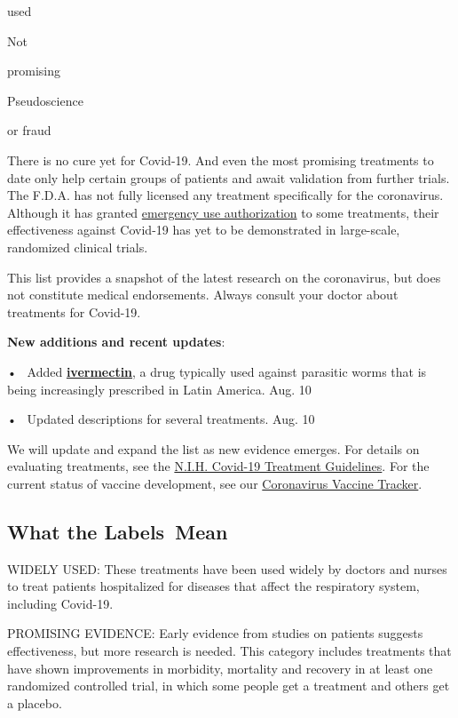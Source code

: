 used

Not

promising

Pseudoscience

or fraud

There is no cure yet for Covid-19. And even the most promising
treatments to date only help certain groups of patients and await
validation from further trials. The F.D.A. has not fully licensed any
treatment specifically for the coronavirus. Although it has granted
\href{https://www.fda.gov/emergency-preparedness-and-response/mcm-legal-regulatory-and-policy-framework/emergency-use-authorization}{emergency
use authorization} to some treatments, their effectiveness against
Covid-19 has yet to be demonstrated in large-scale, randomized clinical
trials.

This list provides a snapshot of the latest research on the coronavirus,
but does not constitute medical endorsements. Always consult your doctor
about treatments for Covid-19.

\textbf{New additions and recent updates}:

•~ Added \textbf{\protect\hyperlink{ivermectin}{ivermectin}}, a drug
typically used against parasitic worms that is being increasingly
prescribed in Latin America. Aug. 10

•~ Updated descriptions for several treatments. Aug. 10

We will update and expand the list as new evidence emerges. For details
on evaluating treatments, see the
\href{https://www.covid19treatmentguidelines.nih.gov/}{N.I.H. Covid-19
Treatment Guidelines}. For the current status of vaccine development,
see our
\href{https://www.nytimes3xbfgragh.onion/interactive/2020/science/coronavirus-vaccine-tracker.html}{Coronavirus
Vaccine Tracker}.

\hypertarget{what-the-labels-mean}{%
\subsection{What the Labels~Mean}\label{what-the-labels-mean}}

WIDELY USED: These treatments have been used widely by doctors and
nurses to treat patients hospitalized for diseases that affect the
respiratory system, including Covid-19.

PROMISING EVIDENCE: Early evidence from studies on patients suggests
effectiveness, but more research is needed. This category includes
treatments that have shown improvements in morbidity, mortality and
recovery in at least one randomized controlled trial, in which some
people get a treatment and others get a placebo.

